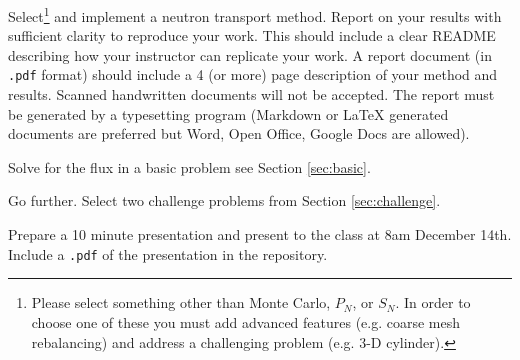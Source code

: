 \documentclass[11pt]{exam}
\begin{document}
\begin{questions}

        \question[30] Select\footnote{Please select something other than Monte Carlo, $P_N$, or $S_N$. In order to choose one of these you must add advanced features (e.g. coarse mesh rebalancing) and address a challenging problem (e.g. 3-D cylinder).} and implement a neutron transport method.  
        Report on your results with sufficient clarity to reproduce your work. This should include a clear README describing how your instructor can replicate your work. A report document (in  \texttt{.pdf} format) should include a 4 (or more) page description of your method and results. Scanned handwritten documents will not be accepted. The report must be generated by a typesetting program (Markdown or LaTeX generated documents are preferred but Word, Open Office, Google Docs are allowed).

        \question[20] Solve for the flux in a basic problem see Section 
        \ref{sec:basic}.

        \question[30] Go further. Select two challenge problems from Section 
\ref{sec:challenge}.

        \question[20] Prepare a 10 minute presentation and present to the class 
        at 8am December 14th. Include a \texttt{.pdf} of the presentation in the repository.

\end{questions}
\end{document}
